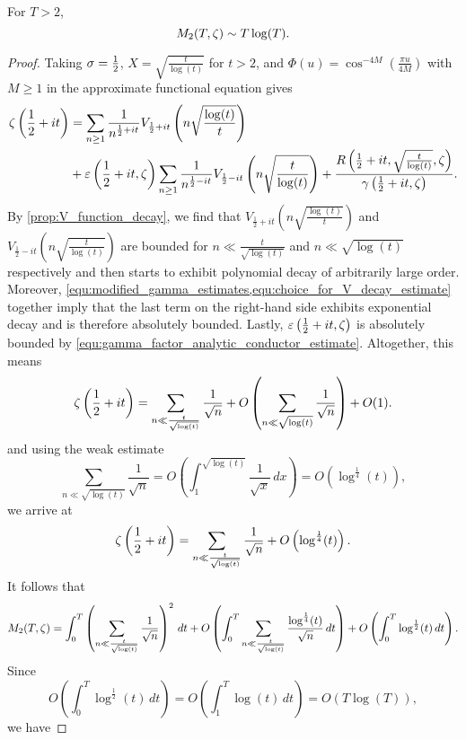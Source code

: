     \begin{theorem}
      For $T > 2$,
      \[
        M_{2}(T,\zeta) \sim T\log(T).
      \]
    \end{theorem}
    \begin{proof}
      Taking $\sigma = \frac{1}{2}$, $X = \sqrt{\frac{t}{\log(t)}}$ for $t > 2$, and $\Phi(u) = \cos^{-4M}\left(\frac{\pi u}{4M}\right)$ with $M \ge 1$ in the approximate functional equation gives
      \begin{align*}
        \zeta\left(\frac{1}{2}+it\right) &= \sum_{n \ge 1}\frac{1}{n^{\frac{1}{2}+it}}V_{\frac{1}{2}+it}\left(n\sqrt{\frac{\log(t)}{t}}\right) \\
        &+ \varepsilon\left(\frac{1}{2}+it,\zeta\right)\sum_{n \ge 1}\frac{1}{n^{\frac{1}{2}-it}}V_{\frac{1}{2}-it}\left(n\sqrt{\frac{t}{\log(t)}}\right)+\frac{R\left(\frac{1}{2}+it,\sqrt{\frac{t}{\log(t)}},\zeta\right)}{\gamma\left(\frac{1}{2}+it,\zeta\right)}.
      \end{align*}
      By \cref{prop:V_function_decay}, we find that $V_{\frac{1}{2}+it}\left(n\sqrt{\frac{\log(t)}{t}}\right)$ and $V_{\frac{1}{2}-it}\left(n\sqrt{\frac{t}{\log(t)}}\right)$ are bounded for $n \ll \frac{t}{\sqrt{\log(t)}}$ and $n \ll \sqrt{\log(t)}$ respectively and then starts to exhibit polynomial decay of arbitrarily large order. Moreover, \cref{equ:modified_gamma_estimates,equ:choice_for_V_decay_estimate} together imply that the last term on the right-hand side exhibits exponential decay and is therefore absolutely bounded. Lastly, $\varepsilon\left(\frac{1}{2}+it,\zeta\right)$ is absolutely bounded by \cref{equ:gamma_factor_analytic_conductor_estimate}. Altogether, this means
      \[
        \zeta\left(\frac{1}{2}+it\right) = \sum_{n \ll \frac{t}{\sqrt{\log(t)}}}\frac{1}{\sqrt{n}}+O\left(\sum_{n \ll \sqrt{\log(t)}}\frac{1}{\sqrt{n}}\right)+O(1).
      \]
      and using the weak estimate
      \[
        \sum_{n \ll \sqrt{\log(t)}}\frac{1}{\sqrt{n}} = O\left(\int_{1}^{\sqrt{\log(t)}}\frac{1}{\sqrt{x}}\,dx\right) = O\left(\log^{\frac{1}{4}}(t)\right),
      \]
      we arrive at
      \[
        \zeta\left(\frac{1}{2}+it\right) = \sum_{n \ll \frac{t}{\sqrt{\log(t)}}}\frac{1}{\sqrt{n}}+O\left(\log^{\frac{1}{4}}(t)\right).
      \]
      It follows that
      \[
        M_{2}(T,\zeta) = \int_{0}^{T}\left(\sum_{n \ll \frac{t}{\sqrt{\log(t)}}}\frac{1}{\sqrt{n}}\right)^{2}\,dt+O\left(\int_{0}^{T}\sum_{n \ll \frac{t}{\sqrt{\log(t)}}}\frac{\log^{\frac{1}{4}}(t)}{\sqrt{n}}\,dt\right)+O\left(\int_{0}^{T}\log^{\frac{1}{2}}(t)\,dt\right).
      \]
      Since
      \[
        O\left(\int_{0}^{T}\log^{\frac{1}{2}}(t)\,dt\right) = O\left(\int_{1}^{T}\log(t)\,dt\right) = O(T\log(T)),
      \]
      we have 
    \end{proof}